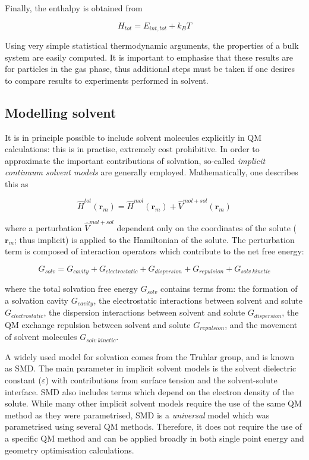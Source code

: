 \noindent Finally, the enthalpy is obtained from

\begin{equation}
  H_{tot} = E_{int,tot} + k_BT
\end{equation}

Using very simple statistical thermodynamic arguments, the properties of a bulk system are easily computed. It is important to emphasise that these results are for particles in the gas phase, thus additional steps must be taken if one desires to compare results to experiments performed in solvent.

\subsection{Modelling solvent}

It is in principle possible to include solvent molecules explicitly in QM calculations: this is in practise, extremely cost prohibitive. In order to approximate the important contributions of solvation, so-called \emph{implicit continuum solvent models} are generally employed.\cite{Mennucci2007,Cramer2004} Mathematically, one describes this as

\begin{equation}
  \hat{H}^{tot}(\mathbf{r}_m) = \hat{H}^{mol}(\mathbf{r}_m) + \hat{V}^{mol+sol}(\mathbf{r}_m)
\end{equation}

\noindent where a perturbation $\hat{V}^{mol+sol}$ dependent only on the coordinates of the solute ($\mathbf{r}_m$; thus implicit) is applied to the Hamiltonian of the solute. The perturbation term is composed of interaction operators which contribute to the net free energy:

\begin{equation}
G_{solv} = G_{cavity} + G_{electrostatic} + G_{dispersion} + G_{repulsion} +
G_{solv~kinetic}
\end{equation}

\noindent where the total solvation free energy $G_{solv}$ contains terms from: the formation of a solvation cavity $G_{cavity}$, the electrostatic interactions between solvent and solute $G_{electrostatic}$, the dispersion interactions between solvent and solute $G_{dispersion}$, the QM exchange repulsion between solvent and solute $G_{repulsion}$, and the movement of solvent molecules $G_{solv~kinetic}$.

A widely used model for solvation comes from the Truhlar group, and is known as SMD.\cite{Marenich2009} The main parameter in implicit solvent models is the solvent dielectric constant ($\varepsilon$) with contributions from surface tension and the solvent-solute interface. SMD also includes terms which depend on the electron density of the solute.  While many other implicit solvent models require the use of the same QM method as they were parametrised,\cite{Ho2010} SMD is a \emph{universal} model which was parametrised using several QM methods. Therefore, it does not require the use of a specific QM method and can be applied broadly in both single point energy and geometry optimisation calculations.


